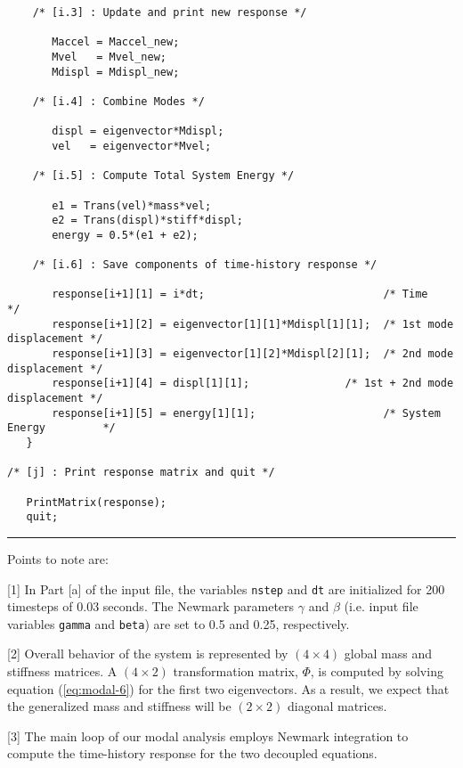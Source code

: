 \begin{footnotesize}
\begin{verbatim}
    /* [i.3] : Update and print new response */

       Maccel = Maccel_new;
       Mvel   = Mvel_new;
       Mdispl = Mdispl_new;

    /* [i.4] : Combine Modes */

       displ = eigenvector*Mdispl;
       vel   = eigenvector*Mvel;

    /* [i.5] : Compute Total System Energy */

       e1 = Trans(vel)*mass*vel;
       e2 = Trans(displ)*stiff*displ;
       energy = 0.5*(e1 + e2);

    /* [i.6] : Save components of time-history response */

       response[i+1][1] = i*dt;                            /* Time                  */
       response[i+1][2] = eigenvector[1][1]*Mdispl[1][1];  /* 1st mode displacement */
       response[i+1][3] = eigenvector[1][2]*Mdispl[2][1];  /* 2nd mode displacement */
       response[i+1][4] = displ[1][1];               /* 1st + 2nd mode displacement */
       response[i+1][5] = energy[1][1];                    /* System Energy         */
   }

/* [j] : Print response matrix and quit */

   PrintMatrix(response);
   quit;
\end{verbatim}
\rule{6.25 in}{0.035 in}
\end{footnotesize}

\vspace{0.15 in}\noindent
Points to note are:

\vspace{0.10 in}
\begin{description}
\item{[1]}
In Part [a] of the input file, the variables {\tt nstep} and {\tt dt}
are initialized for 200 timesteps of 0.03 seconds.
The Newmark parameters $\gamma$
and $\beta$ (i.e. input file variables {\tt gamma} and {\tt beta}) are
set to 0.5 and 0.25, respectively.
\item{[2]}
Overall behavior of the system is represented
by $(4 \times 4)$ global mass and stiffness matrices. 
A $(4 \times 2)$ transformation matrix, $\Phi$, is computed by
solving equation (\ref{eq:modal-6}) for the first two eigenvectors.
As a result, we expect that the generalized mass and
stiffness will be $(2 \times 2)$ diagonal matrices.
\item{[3]}
The main loop of our modal analysis employs Newmark integration to
compute the time-history response for the two decoupled equations.
\end{description}

